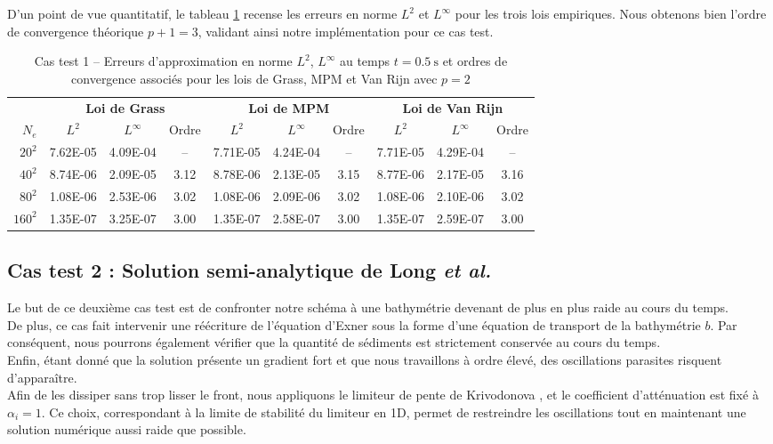 \documentclass[11pt, a4paper, oneside]{report}
\begin{document}
D'un point de vue quantitatif, le tableau \ref{tab:manufacturee_2D_cartesien} recense les erreurs en norme $L^2$ et $L^\infty$ pour les trois lois empiriques. Nous obtenons bien l'ordre de convergence théorique $p+1 = 3$, validant ainsi notre implémentation pour ce cas test.

\begin{table}[h!]
    \centering
    \small %
    \begin{tabular}{r ccc ccc ccc}
    \toprule
    & \multicolumn{3}{c}{\textbf{Loi de Grass}} & \multicolumn{3}{c}{\textbf{Loi de MPM}} & \multicolumn{3}{c}{\textbf{Loi de Van Rijn}} \\
    \cmidrule(lr){2-4} \cmidrule(lr){5-7} \cmidrule(lr){8-10}
    $N_e$ & $L^2$ & $L^\infty$ & Ordre & $L^2$ & $L^\infty$ & Ordre & $L^2$ & $L^\infty$ & Ordre \\
    \midrule
    $20^2$ & 7.62E-05 & 4.09E-04 & -- & 7.71E-05 & 4.24E-04 & -- & 7.71E-05 & 4.29E-04 & -- \\
    $40^2$ & 8.74E-06 & 2.09E-05 & 3.12 & 8.78E-06 & 2.13E-05 & 3.15 & 8.77E-06 & 2.17E-05 & 3.16 \\
    $80^2$ & 1.08E-06 & 2.53E-06 & 3.02 & 1.08E-06 & 2.09E-06 & 3.02 & 1.08E-06 & 2.10E-06 & 3.02 \\
    $160^2$ & 1.35E-07 & 3.25E-07 & 3.00 & 1.35E-07 & 2.58E-07 & 3.00 & 1.35E-07 & 2.59E-07 & 3.00 \\
    \bottomrule
    \end{tabular}
    \caption{Cas test 1 -- Erreurs d'approximation en norme $L^2$, $L^\infty$ au temps $t = \SI{0.5}{\second}$ et ordres de convergence associés pour les lois de Grass, MPM et Van Rijn avec $p = 2$}
    \label{tab:manufacturee_2D_cartesien}
\end{table}

\subsection{Cas test 2 : Solution semi-analytique de Long \textit{et al.}}

Le but de ce deuxième cas test est de confronter notre schéma à une bathymétrie devenant de plus en plus raide au cours du temps. \\
De plus, ce cas fait intervenir une réécriture de l'équation d'Exner sous la forme d'une équation de transport de la bathymétrie $b$. 
Par conséquent, nous pourrons également vérifier que la quantité de sédiments est strictement conservée au cours du temps. \\
Enfin, étant donné que la solution présente un gradient fort et que nous travaillons à ordre élevé, des oscillations parasites risquent d'apparaître. \\
Afin de les dissiper sans trop lisser le front, nous appliquons le limiteur de pente de \mbox{Krivodonova} \cite{krivodonova2007limiters}, et le coefficient d'atténuation est fixé à $\alpha_i = 1$. 
Ce choix, correspondant à la limite de stabilité du limiteur en 1D, permet de restreindre les oscillations tout en maintenant une solution numérique aussi raide que possible.
\end{document}
